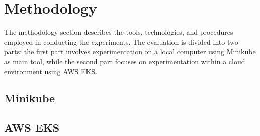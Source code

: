 \section{Methodology}

The methodology section describes the tools, technologies, and procedures employed in conducting the experiments.
The evaluation is divided into two parts: the first part involves experimentation on a local computer using Minikube as main tool, while the second part focuses on experimentation within a cloud environment using AWS EKS.

\subsection{Minikube} %

\subsection{AWS EKS} %
